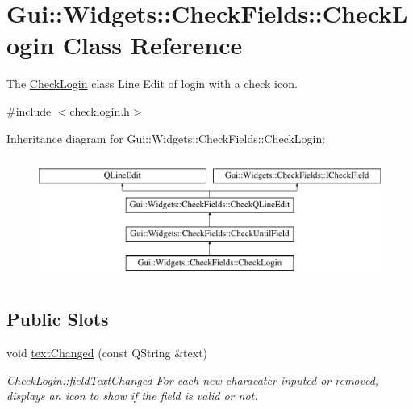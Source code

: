 \hypertarget{classGui_1_1Widgets_1_1CheckFields_1_1CheckLogin}{\section{Gui\-:\-:Widgets\-:\-:Check\-Fields\-:\-:Check\-Login Class Reference}
\label{classGui_1_1Widgets_1_1CheckFields_1_1CheckLogin}
}


The \hyperlink{classGui_1_1Widgets_1_1CheckFields_1_1CheckLogin}{Check\-Login} class Line Edit of login with a check icon.  




{\ttfamily \#include $<$checklogin.\-h$>$}

Inheritance diagram for Gui\-:\-:Widgets\-:\-:Check\-Fields\-:\-:Check\-Login\-:\begin{figure}[H]
\begin{center}
\leavevmode
\includegraphics[height=4.000000cm]{dd/dfe/classGui_1_1Widgets_1_1CheckFields_1_1CheckLogin}
\end{center}
\end{figure}
\subsection*{Public Slots}
\begin{DoxyCompactItemize}
\item 
\hypertarget{classGui_1_1Widgets_1_1CheckFields_1_1CheckLogin_a204d78c6e62cee16573fe8075d1a534c}{void \hyperlink{classGui_1_1Widgets_1_1CheckFields_1_1CheckLogin_a204d78c6e62cee16573fe8075d1a534c}{text\-Changed} (const Q\-String \&text)}\label{classGui_1_1Widgets_1_1CheckFields_1_1CheckLogin_a204d78c6e62cee16573fe8075d1a534c}

\begin{DoxyCompactList}\small\item\em \hyperlink{classGui_1_1Widgets_1_1CheckFields_1_1CheckQLineEdit_ad297d518964bd170e8cc7533795ff99e}{Check\-Login\-::field\-Text\-Changed} For each new characater inputed or removed, displays an icon to show if the field is valid or not. \end{DoxyCompactList}\end{DoxyCompactItemize}
